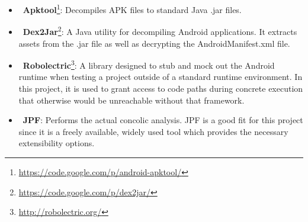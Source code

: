 \documentclass{sig-alternate}
\begin{document}
\begin{itemize}
    \setlength{\itemsep}{0pt} %
    \setlength{\parskip}{0pt} %
    \setlength{\parsep}{0pt}  %

\item~\textbf{Apktool}\footnote{\url{https://code.google.com/p/android-apktool/}}: Decompiles APK files to standard Java .jar files.

\item~\textbf{Dex2Jar}\footnote{\url{https://code.google.com/p/dex2jar/}}: A Java utility for decompiling Android applications. It extracts assets from the .jar file as well as decrypting the AndroidManifest.xml file.

\item~\textbf{Robolectric}\footnote{\url{http://robolectric.org/}}: A library designed to stub and mock out the Android runtime when testing a project outside of a standard runtime environment. In this project, it is used to grant access to code paths during concrete execution that otherwise would be unreachable without that framework.

\item~\textbf{JPF}\cite{visser2003model}: Performs the actual concolic analysis. JPF is a good fit for this project since it is a freely available, widely used tool which provides the necessary extensibility options.



\end{itemize}
\end{document}
